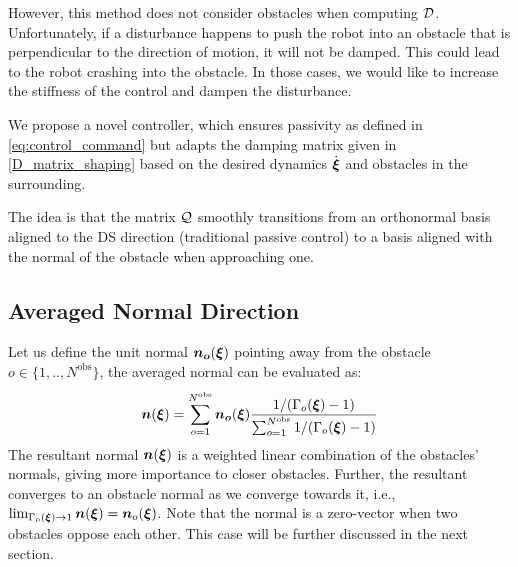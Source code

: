 \documentclass[conference]{IEEEtran}
\begin{document}
However, this method does not consider obstacles when computing $\mathcal{D}$. Unfortunately, if a disturbance happens to push the robot into an obstacle that is perpendicular to the direction of motion, it will not be damped. This could lead to the robot crashing into the obstacle. In those cases, we would like to increase the stiffness of the control and dampen the disturbance.

We propose a novel controller, which ensures passivity as defined in \eqref{eq:control_command} but adapts the damping matrix given in \eqref{D_matrix_shaping} based on the desired dynamics $\dot{\boldsymbol{\xi}}$ and obstacles in the surrounding. 

The idea is that the matrix $\mathcal{Q}$ smoothly transitions from an orthonormal basis aligned to the DS direction (traditional passive control) to a basis aligned with the normal of the obstacle when approaching one.

\subsection{Averaged Normal Direction} \label{sec:obstacle_normals}
Let us define the unit normal $\boldsymbol{n_o} (\boldsymbol{\xi})$  pointing away from the obstacle $o \in \{1,  ..,  N^{\mathrm{obs}} \}$, the averaged normal can be evaluated as:
\begin{equation}
  \boldsymbol{n}(\boldsymbol{\xi}) = \sum_{o=1}^{N^{\mathrm{obs}}} \boldsymbol{n_o}(\boldsymbol{\xi})
  \frac{1 / (\Gamma_o(\boldsymbol{\xi}) - 1)}{\sum_{o=1}^{N^\mathrm{obs}} 1 / (\Gamma_o(\boldsymbol{\xi}) - 1)}
\end{equation}
The resultant normal $\boldsymbol{n}(\boldsymbol{\xi})$ is a weighted linear combination of the obstacles' normals, giving more importance to closer obstacles.
Further, the resultant converges to an obstacle normal as we converge towards it, i.e., $\lim_{\Gamma_o(\boldsymbol{\xi}) \rightarrow 1} \boldsymbol{n}(\boldsymbol{\xi}) = \boldsymbol{n}_o(\boldsymbol{\xi})$.
Note that the normal is a zero-vector when two obstacles oppose each other. This case will be further discussed in the next section.
\end{document}
